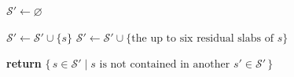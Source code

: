 \begin{algorithm}
\begin{algorithmic}[1]
    \State $\mathcal{S}' \gets \varnothing$

            \State $\mathcal{S}' \gets \mathcal{S}' \cup \{s\}$
        \Else
            \State $\mathcal{S}' \gets \mathcal{S}' \cup
                   \{\text{the up to six residual slabs of } s\}$
        \EndIf
    \EndFor

    \State \textbf{return} $\{\, s \in \mathcal{S}' \mid
           s \text{ is not contained in another } s' \in \mathcal{S}' \,\}$

\EndProcedure
\end{algorithmic}
\end{algorithm}
